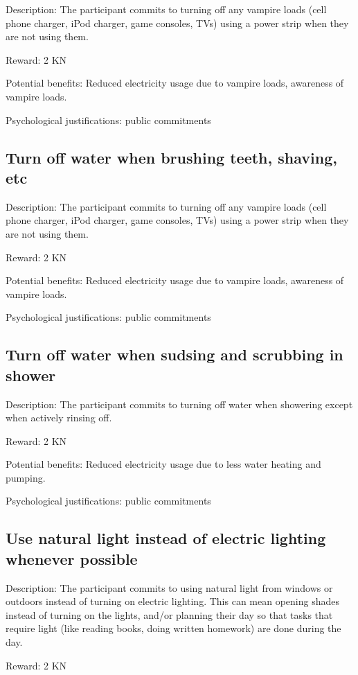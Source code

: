 Description: The participant commits to turning off any vampire loads (cell phone charger, iPod charger, game consoles, TVs) using a power strip when they are not using them.

Reward: 2 KN

Potential benefits: Reduced electricity usage due to vampire loads, awareness of vampire loads.

Psychological justifications: public commitments

\subsection{Turn off water when brushing teeth, shaving, etc}

Description: The participant commits to turning off any vampire loads (cell phone charger, iPod charger, game consoles, TVs) using a power strip when they are not using them.

Reward: 2 KN

Potential benefits: Reduced electricity usage due to vampire loads, awareness of vampire loads.

Psychological justifications: public commitments

\subsection{Turn off water when sudsing and scrubbing in shower}

Description: The participant commits to turning off water when showering except when actively rinsing off.

Reward: 2 KN

Potential benefits: Reduced electricity usage due to less water heating and pumping.

Psychological justifications: public commitments

\subsection{Use natural light instead of electric lighting whenever possible}

Description: The participant commits to using natural light from windows or outdoors instead of turning on electric lighting. This can mean opening shades instead of turning on the lights, and/or planning their day so that tasks that require light (like reading books, doing written homework) are done during the day.

Reward: 2 KN

